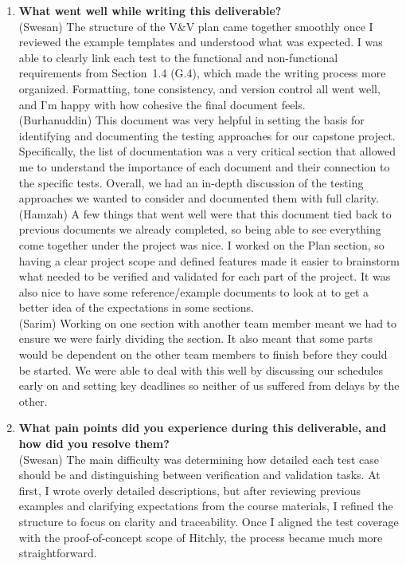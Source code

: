 \documentclass[12pt, titlepage]{article}
\begin{document}
\begin{enumerate}

\item \textbf{What went well while writing this deliverable?}\\
(Swesan) The structure of the V\&V plan came together smoothly once I reviewed the example templates and understood what was expected. I was able to clearly link each test to the functional and non-functional requirements from Section~1.4 (G.4), which made the writing process more organized. Formatting, tone consistency, and version control all went well, and I'm happy with how cohesive the final document feels.\\

(Burhanuddin)
This document was very helpful in setting the basis for identifying and documenting the testing approaches for our capstone project. Specifically, the list of documentation was a very critical section that allowed me to understand the importance of each document and their connection to the specific tests. Overall, we had an in-depth discussion of the testing approaches we wanted to consider and documented them with full clarity.  \\

(Hamzah)
A few things that went well were that this document tied back to previous documents we already completed, so being able to see everything come together under the project was nice. I worked on the Plan section, so having a clear project scope and defined features made it easier to brainstorm what needed to be verified and validated for each part of the project. It was also nice to have some reference/example documents to look at to get a better idea of the expectations in some sections.  \\

(Sarim)
Working on one section with another team member meant we had to ensure we were fairly dividing the section. It also meant that some parts would be dependent on the other team members to finish before they could be started. We were able to deal with this well by discussing our schedules early on and setting key deadlines so neither of us suffered from delays by the other. \\

\item \textbf{What pain points did you experience during this deliverable, and how did you resolve them?}\\
(Swesan) The main difficulty was determining how detailed each test case should be and distinguishing between verification and validation tasks. At first, I wrote overly detailed descriptions, but after reviewing previous examples and clarifying expectations from the course materials, I refined the structure to focus on clarity and traceability. Once I aligned the test coverage with the proof-of-concept scope of Hitchly, the process became much more straightforward.\\


\end{enumerate}
\end{document}
